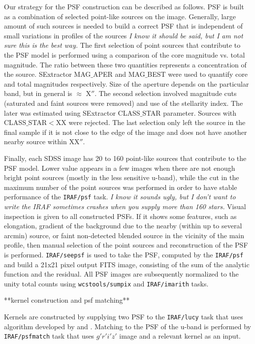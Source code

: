 \documentclass[numberedappendix,apj,twocolumn]{emulateapj}
\begin{document}
Our strategy for the PSF construction can be described as follows. PSF is built as a combination of selected point-like sources on the image. Generally, large amount of such sources is needed to build a correct PSF that is independent of small variations in profiles of the sources \textit{I know it should be said, but I am not sure this is the best way.} The first selection of point sources that contribute to the PSF model is performed using a comparison of the core magnitude vs. total magnitude. The ratio between these two quantities represents a concentration of the source. SExtractor MAG$\_$APER and MAG$\_$BEST were used to quantify core and total magnitudes respectively. Size of the aperture depends on the particular band, but in general is $\approx$ X$''$.
The second selection involved magnitude cuts (saturated and faint sources were removed) and use of the stellarity index. The later was estimated using SExtractor CLASS$\_$STAR parameter. Sources with CLASS$\_$STAR$<$XX were rejected. The last selection only left the source in the final sample if it is not close to the edge of the image and does not have another nearby source within XX$''$. 

Finally, each SDSS image has 20 to 160 point-like sources that contribute to the PSF model. Lower value appears in a few images when there are not enough bright point sources (mostly in the less sensitive u-band), while the cut in the maximum number of the point sources was performed in order to have stable performance of the {\tt IRAF/psf} task. \textit{I know it sounds ugly, but I don't want to write the IRAF sometimes  crashes when you supply more than 160 stars.} Visual inspection is given to all constructed PSFs. If it shows some features, such as elongation, gradient of the background due to the nearby (within up to several arcmin) source, or faint non-detected blended source in the vicinity of the main profile, then manual selection of the point sources and reconstruction of the PSF is performed. {\tt IRAF/seepsf} is used to take the PSF, computed by the {\tt IRAF/psf} and build a 21x21 pixel output FITS image, consisting of the sum of the analytic function and the residual. All PSF images are subsequently normalized to the unity total counts using {\tt wcstools/sumpix} \citep{Mink1998b} and {\tt IRAF/imarith} tasks. 

**kernel construction and psf matching**

Kernels are constructed by supplying two PSF to the {\tt IRAF/lucy} task that uses algorithm developed by \citet{Richardson1972} and \citet{Lucy1974}. Matching to the PSF of the u-band is performed by {\tt IRAF/psfmatch} task that uses $g'r'i'z'$ image and a relevant kernel as an input.
\end{document}
